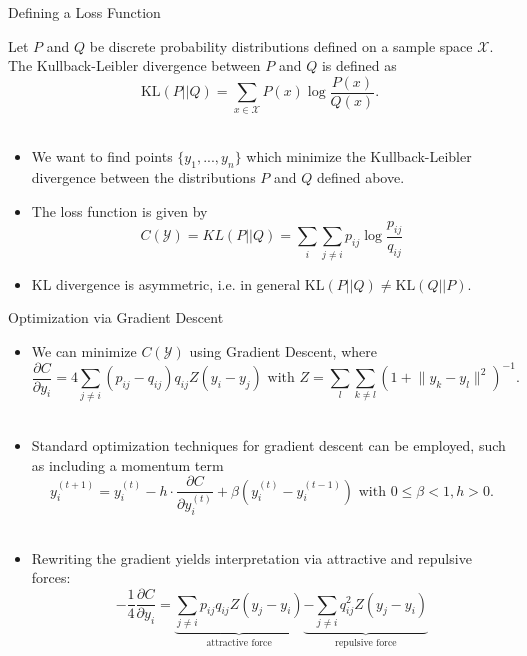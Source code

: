 \begin{frame}{Defining a Loss Function}
    \begin{definition}
        Let $P$ and $Q$ be discrete probability distributions defined on a sample space $\mathcal{X}$. 
        The Kullback-Leibler divergence between $P$ and $Q$ is defined as 
        \[ \text{KL}(P|| Q) = \sum_{x \in \mathcal{X}} P(x) \log \frac{P(x)}{Q(x)}.\] 
    \end{definition} \pause
    \begin{itemize}
        
        \item We want to find points $\{y_1, ..., y_n\}$ which minimize the Kullback-Leibler divergence between the distributions $P$ and $Q$ defined above. \pause
        \item The loss function is given by \[ C(\mathcal{Y}) = KL(P||Q) = \sum_{i} \sum_{j \neq i}  p_{ij} \log \frac{p_{ij}}{q_{ij}}\] \pause
        \item KL divergence is asymmetric, i.e. in general $\text{KL}(P || Q) \neq \text{KL}(Q || P)$. 
    \end{itemize}
\end{frame}

\begin{frame}{Optimization via Gradient Descent}
    \begin{itemize}
        \item We can minimize $C(\mathcal{Y})$ using Gradient Descent, where 
        \[ \frac{\partial C}{\partial y_i} = 4 \sum_{j \neq i} (p_{ij} - q_{ij}) q_{ij} Z (y_i - y_j)
        \text{ with } Z = \sum_{l} \sum_{k\neq l} (1+ \lVert y_k - y_l \rVert^2)^{-1}.\] \\ \pause 
        \item Standard optimization techniques for gradient descent can be employed, such as including a momentum term
        \[ y_i^{(t+1)} = y_i^{(t)} - h \cdot \frac{\partial C}{\partial y_i^{(t)}} + \beta (y_i^{(t)} - y_i^{(t-1)}) \text{ with } 0 \leq \beta < 1, h>0. \] \pause
        \item Rewriting the gradient yields interpretation via attractive and repulsive forces: 
        \[ -\frac{1}{4} \frac{\partial C}{\partial y_i} = \underbrace{\sum_{j\neq i} p_{ij} q_{ij} Z (y_j - y_i)}_\text{attractive force} \underbrace{-\sum_{j \neq i} q_{ij}^2 Z (y_j - y_i)}_\text{repulsive force}
        \] 
        
    \end{itemize}
\end{frame}


